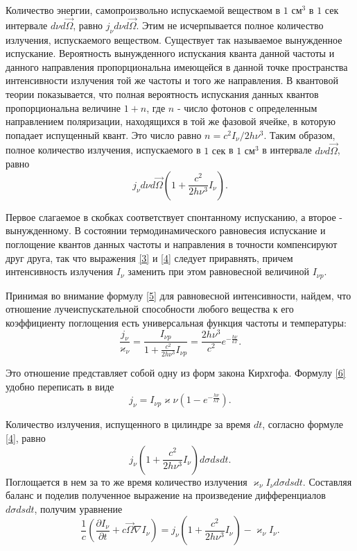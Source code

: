 Количество энергии, самопроизвольно испускаемой веществом  в $1 \text{ см}^3$ в  $1 \text{ сек}$ интервале $d\nu d\vec\Omega$, равно $j_{\nu}d\nu d\vec\Omega$. Этим не исчерпывается полное количество излучения, испускаемого веществом. Существует так называемое вынужденное испускание. Вероятность вынужденного испускания кванта данной частоты и данного направления пропорциональна имеющейся в данной точке пространства интенсивности излучения той же частоты и того же направления. В квантовой теории показывается, что полная вероятность испускания данных квантов пропорциональна величине $1+n$, где $n$ - число фотонов с определенным направлением поляризации, находящихся в той же фазовой ячейке, в которую попадает испущенный квант. Это число равно $n= c^2I_{\nu}/2h\nu^3$. Таким образом, полное количество излучения, испускаемого в $1 \text{ сек}$ в $1 \text{ см}^3$ в интервале $d\nu d\vec\Omega$, равно 
\begin {equation}
j_{\nu} d\nu d\vec\Omega(1+\frac{c^2}{2h\nu^3}I_{\nu}).
\label{4}
\end {equation}

Первое слагаемое в скобках соответствует спонтанному испусканию, а второе - вынужденному. В состоянии термодинамического равновесия испускание и поглощение квантов данных частоты и направления в точности компенсируют друг друга, так что выражения \eqref{3} и \eqref{4} следует приравнять, причем интенсивность излучения $I_{\nu}$ заменить при этом равновесной величиной $I_{\nu p}$. 

Принимая во внимание формулу \eqref{5} для равновесной интенсивности, найдем, что отношение лучеиспускательной способности любого вещества к его коэффициенту поглощения есть универсальная функция частоты и температуры:
\begin {equation}
\frac{j_{\nu}}{\varkappa_{\nu}} =  \frac{I_{\nu p}}{1+\frac{c^2}{2h\nu^3}I_{\nu p}} = \frac{2h\nu^3}{c^2}e^{-\frac{h\nu}{kT}}.
\label{6}
\end {equation}

Это отношение представляет собой одну из форм закона Кирхгофа. Формулу \eqref{6} удобно переписать в виде
\begin {equation}
j_{\nu} = I_{\nu p}\varkappa{\nu}(1-e^{-\frac{h\nu}{kT}}).
\label{7}
\end {equation}

Количество излучения, испущенного в цилиндре за время $dt$, согласно формуле \eqref{4}, равно
\begin {equation}
j_{\nu}(1 + \frac {c^2}{2h\nu^3}I_{\nu})d\sigma ds dt.
\end {equation}
Поглощается в нем за то же время количество излучения $\varkappa_{\nu} I_{\nu}d\sigma dsdt$. Составляя баланс и поделив полученное выражение на произведение дифференциалов $d\sigma dsdt$, получим уравнение
\begin {equation}
\frac{1}{c} (\frac{\partial I_{\nu}}{\partial t} + c \vec \Omega \nabla I_{\nu}) = j_{\nu} (1 + \frac {c^2}{2h\nu^3}I_{\nu}) - \varkappa_{\nu}I_{\nu}.
\label{1}
\end {equation}

